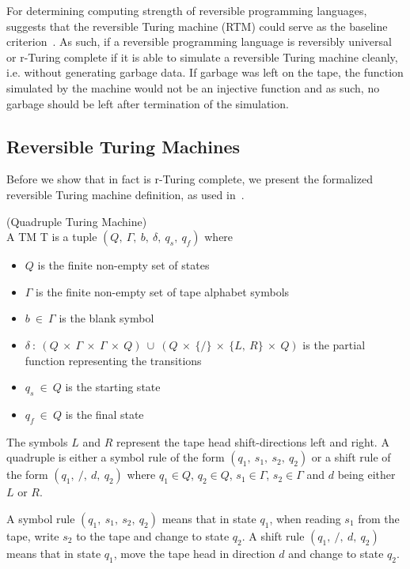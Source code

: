 For determining computing strength of reversible programming languages,~\citeauthor{ty:ejanus} suggests that the reversible Turing machine (RTM) could serve as the baseline criterion~\cite{ty:ejanus}. As such, if a reversible programming language is reversibly universal or r-Turing complete if it is able to simulate a reversible Turing machine cleanly, i.e. without generating garbage data. If garbage was left on the tape, the function simulated by the machine would not be an injective function and as such, no garbage should be left after termination of the simulation.

\subsection{Reversible Turing Machines}
\label{subsec:reversible-turing-machine}
Before we show that \rooplpp in fact is r-Turing complete, we present the formalized reversible Turing machine definition, as used in~\cite{ty:ejanus}.
\vspace{4mm}
\begin{definition}
    \label{def:quadruple-tm}(Quadruple Turing Machine)\vspace{4mm}\\
    \noindent A TM T is a tuple $(Q,\ \Gamma,\ b,\ \delta,\ q_s,\ q_f)$ where
    \begin{itemize}[label = {}, itemsep = 1pt]
        \item $Q$ is the finite non-empty set of states
        \item $\Gamma$ is the finite non-empty set of tape alphabet symbols
        \item $b\ \in\ \Gamma$ is the blank symbol
        \item $\delta\ :\ (Q\ \times\ \Gamma\ \times\ \Gamma\ \times\ Q)\ \cup\ (Q\ \times\ \{/\}\ \times\ \{L,\ R\}\ \times\ Q)$ is the partial function representing the transitions
        \item $q_s\ \in\ Q$ is the starting state
        \item $q_f\ \in\ Q$ is the final state
    \end{itemize}
    The symbols $L$ and $R$ represent the tape head shift-directions left and right. A quadruple is either a symbol rule of the form $(q_1,\ s_1,\ s_2,\ q_2)$ or a shift rule of the form $(q_1,\ /,\ d,\ q_2)$ where $q_1 \in Q$, $q_2 \in Q$, $s_1 \in \Gamma$, $s_2 \in \Gamma$ and $d$ being either $L$ or $R$.
    
    A symbol rule $(q_1,\ s_1,\ s_2,\ q_2)$ means that in state $q_1$, when reading $s_1$ from the tape, write $s_2$ to the tape and change to state $q_2$. A shift rule $(q_1,\ /,\ d,\ q_2)$ means that in state $q_1$, move the tape head in direction $d$ and change to state $q_2$.
\end{definition}
